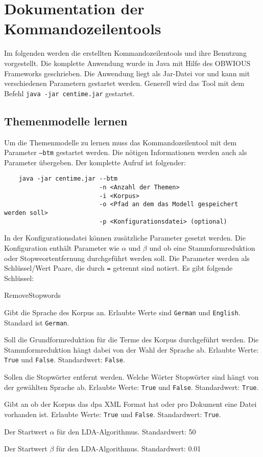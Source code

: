 \section{Dokumentation der Kommandozeilentools}
	Im folgenden werden die erstellten Kommandozeilentools und ihre Benutzung vorgestellt. Die komplette Anwendung wurde in   
	Java mit Hilfe des OBWIOUS Frameworks geschrieben. Die Anwendung liegt als Jar-Datei vor und kann mit verschiedenen 
	Parametern gestartet werden. Generell wird das Tool mit dem Befehl \texttt{java -jar centime.jar} gestartet.
	
	\subsection*{Themenmodelle lernen}
	Um die Themenmodelle zu lernen muss das Kommandozeilentool mit dem Parameter \texttt{--btm} gestartet werden. Die nötigen
	Informationen werden auch als Parameter übergeben. Der komplette Aufruf ist folgender:

	\begin{verbatim}
	java -jar centime.jar --btm 
	                      -n <Anzahl der Themen>
	                      -i <Korpus> 
	                      -o <Pfad an dem das Modell gespeichert werden soll>
	                      -p <Konfigurationsdatei> (optional)
	\end{verbatim}
	In der Konfigurationsdatei können zusätzliche Parameter gesetzt werden. Die Konfiguration enthält Parameter wie $\alpha$ 		und $\beta$ und ob eine Stammformreduktion oder Stopweortentfernung durchgeführt werden soll. Die Parameter werden als 			Schlüssel/Wert Paare, die durch \texttt{=} getrennt sind notiert. Es gibt folgende Schlüssel:
	\begin{labeling}[]{RemoveStopwords}
		\item[\texttt{Language}] Gibt die Sprache des Korpus an. Erlaubte Werte sind \texttt{German} und \texttt{English}. Standard 							ist \texttt{German}.
		
		\item[\texttt{UseStemming}] Soll die Grundformreduktion für die Terme des Korpus durchgeführt werden. Die Stammformreduktion 								hängt dabei von der Wahl der Sprache ab. Erlaubte Werte: \texttt{True} und \texttt{False}. 										Standardwert: \texttt{False}. 
		\item[\texttt{RemoveStopwords}] Sollen die Stopwörter entfernt werden. Welche Wörter Stopwörter sind hängt von der gewählten 									Sprache ab. Erlaubte Werte: \texttt{True} und \texttt{False}. Standardwert: \texttt{True}. 
		\item[\texttt{IsCorpusDPA}] Gibt an ob der Korpus das dpa XML Format hat oder pro Dokument eine Datei vorhanden ist. Erlaubte 								Werte: \texttt{True} und \texttt{False}. Standardwert: \texttt{True}. 
		\item[\texttt{AlphaSum}] Der Startwert $\alpha$ für den LDA-Algorithmus. Standardwert: 50
		\item[\texttt{Beta}] Der Startwert $\beta$ für den LDA-Algorithmus. Standardwert: 0.01
	\end{labeling}
	
